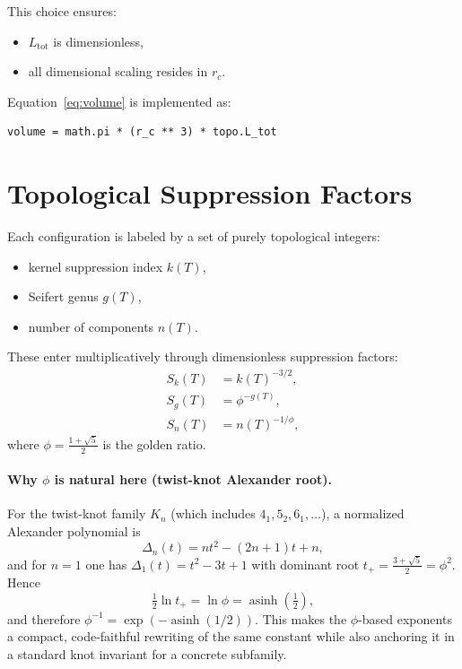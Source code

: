 \documentclass[11pt,a4paper]{article}
\begin{document}
        This choice ensures:
        \begin{itemize}
            \item $L_{\text{tot}}$ is dimensionless,
            \item all dimensional scaling resides in $r_c$.
        \end{itemize}

        Equation~\eqref{eq:volume} is implemented as:
        \begin{verbatim}
volume = math.pi * (r_c ** 3) * topo.L_tot
        \end{verbatim}

    \section{Topological Suppression Factors}

        Each configuration is labeled by a set of purely topological integers:
        \begin{itemize}
            \item kernel suppression index $k(T)$,
            \item Seifert genus $g(T)$,
            \item number of components $n(T)$.
        \end{itemize}

        These enter multiplicatively through dimensionless suppression factors:
        \begin{align}
            S_k(T) &= k(T)^{-3/2}, \\
            S_g(T) &= \phi^{-g(T)}, \\
            S_n(T) &= n(T)^{-1/\phi},
        \end{align}
        where $\phi = \tfrac{1+\sqrt{5}}{2}$ is the golden ratio.

        \paragraph{Why $\phi$ is natural here (twist-knot Alexander root).}
        For the twist-knot family $K_n$ (which includes $4_1, 5_2, 6_1,\dots$), a normalized Alexander polynomial is
        \begin{equation}
            \Delta_n(t) = n t^2 - (2n+1)t + n,
            \label{eq:alexander_twist}
        \end{equation}
        and for $n=1$ one has $\Delta_1(t)=t^2-3t+1$ with dominant root $t_+=\tfrac{3+\sqrt{5}}{2}=\phi^2$.
        Hence
        \[
            \tfrac12 \ln t_+ = \ln\phi = \operatorname{asinh}\!\left(\tfrac12\right),
        \]
        and therefore $\phi^{-1}=\exp(-\operatorname{asinh}(1/2))$. This makes the $\phi$-based exponents a compact,
        code-faithful rewriting of the same constant while also anchoring it in a standard knot invariant for a concrete
        subfamily. \cite{Lee2025DoubleTwist}
\end{document}
